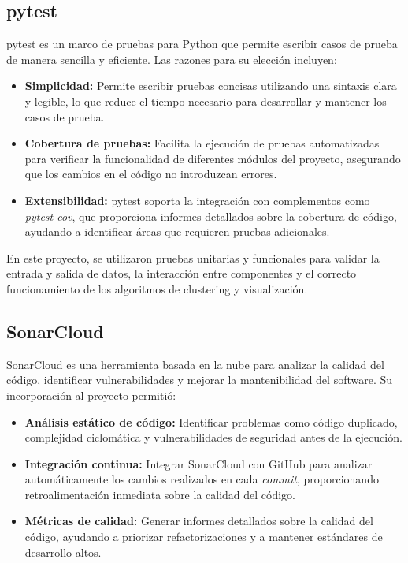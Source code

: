 \subsection*{pytest}

pytest es un marco de pruebas para Python que permite escribir casos de prueba de manera sencilla y eficiente. Las razones para su elección incluyen:

\begin{itemize}
    \item \textbf{Simplicidad:} Permite escribir pruebas concisas utilizando una sintaxis clara y legible, lo que reduce el tiempo necesario para desarrollar y mantener los casos de prueba.
    \item \textbf{Cobertura de pruebas:} Facilita la ejecución de pruebas automatizadas para verificar la funcionalidad de diferentes módulos del proyecto, asegurando que los cambios en el código no introduzcan errores.
    \item \textbf{Extensibilidad:} pytest soporta la integración con complementos como \textit{pytest-cov}, que proporciona informes detallados sobre la cobertura de código, ayudando a identificar áreas que requieren pruebas adicionales.
\end{itemize}

En este proyecto, se utilizaron pruebas unitarias y funcionales para validar la entrada y salida de datos, la interacción entre componentes y el correcto funcionamiento de los algoritmos de clustering y visualización.

\subsection*{SonarCloud}

SonarCloud es una herramienta basada en la nube para analizar la calidad del código, identificar vulnerabilidades y mejorar la mantenibilidad del software. Su incorporación al proyecto permitió:

\begin{itemize}
    \item \textbf{Análisis estático de código:} Identificar problemas como código duplicado, complejidad ciclomática y vulnerabilidades de seguridad antes de la ejecución.
    \item \textbf{Integración continua:} Integrar SonarCloud con GitHub para analizar automáticamente los cambios realizados en cada \textit{commit}, proporcionando retroalimentación inmediata sobre la calidad del código.
    \item \textbf{Métricas de calidad:} Generar informes detallados sobre la calidad del código, ayudando a priorizar refactorizaciones y a mantener estándares de desarrollo altos.
\end{itemize}

